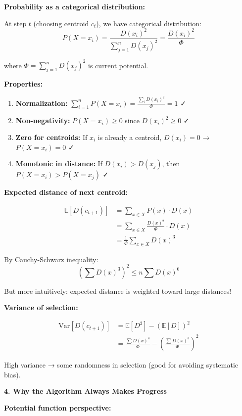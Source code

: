 \documentclass[12pt]{article}
\begin{document}
\begin{explanation}
\textbf{Probability as a categorical distribution:}

At step $t$ (choosing centroid $c_t$), we have categorical distribution:
\[
P(X = x_i) = \frac{D(x_i)^2}{\sum_{j=1}^n D(x_j)^2} = \frac{D(x_i)^2}{\Phi}
\]

where $\Phi = \sum_{j=1}^n D(x_j)^2$ is current potential.

\textbf{Properties:}

\begin{enumerate}
    \item \textbf{Normalization:} $\sum_{i=1}^n P(X = x_i) = \frac{\sum_i D(x_i)^2}{\Phi} = 1$ ✓

    \item \textbf{Non-negativity:} $P(X = x_i) \geq 0$ since $D(x_i)^2 \geq 0$ ✓

    \item \textbf{Zero for centroids:} If $x_i$ is already a centroid, $D(x_i) = 0$ → $P(X = x_i) = 0$ ✓

    \item \textbf{Monotonic in distance:} If $D(x_i) > D(x_j)$, then $P(X = x_i) > P(X = x_j)$ ✓
\end{enumerate}

\textbf{Expected distance of next centroid:}

\begin{align*}
\mathbb{E}[D(c_{t+1})] &= \sum_{x \in X} P(x) \cdot D(x) \\
&= \sum_{x \in X} \frac{D(x)^2}{\Phi} \cdot D(x) \\
&= \frac{1}{\Phi}\sum_{x \in X} D(x)^3
\end{align*}

By Cauchy-Schwarz inequality:
\[
\left(\sum D(x)^3\right)^2 \leq n \sum D(x)^6
\]

But more intuitively: expected distance is weighted toward large distances!

\textbf{Variance of selection:}

\begin{align*}
\text{Var}[D(c_{t+1})] &= \mathbb{E}[D^2] - (\mathbb{E}[D])^2 \\
&= \frac{\sum D(x)^4}{\Phi} - \left(\frac{\sum D(x)^3}{\Phi}\right)^2
\end{align*}

High variance → some randomness in selection (good for avoiding systematic bias).

\textbf{4. Why the Algorithm Always Makes Progress}

\textbf{Potential function perspective:}


\end{explanation}
\end{document}
